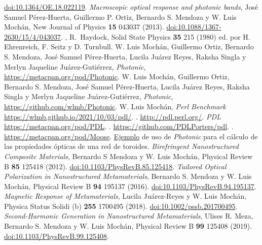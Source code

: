 \documentclass[12pt]{article}
\begin{document}
\begin{thebibliography}{0000}
 \href{https://www.osapublishing.org/oe/fulltext.cfm?uri=oe-18-21-22119&id=206120}
 {doi:10.1364/OE.18.022119}.
   {\em Macroscopic optical response and photonic
    bands}, José Samuel Pérez-Huerta, Guillermo P. Ortiz, Bernardo
  S. Mendoza y W. Luis Mochán, New Journal of Physics {\bf 15}
  043037 (2013).
  \href{https://iopscience.iop.org/article/10.1088/1367-2630/15/4/043037}
  {doi:10.1088/1367-2630/15/4/043037}.
,
R.~Haydock, Solid State Physics  {\bf 35} 215 (1980) ed. por
H. Ehrenreich, F. Seitz y D. Turnbull.
  W. Luis Mochán, Guillermo Ortiz, Bernardo S. Mendoza, José Samuel
  Pérez-Huerta, Lucila Juárez Reyes, Raksha Singla y Merlyn Jaqueline
  Juárez-Gutiérrez, {\em Photonic}, \url{https://metacpan.org/pod/Photonic}.
  W. Luis Mochán, Guillermo Ortiz, Bernardo S. Mendoza, José Samuel
  Pérez-Huerta, Lucila Juárez Reyes, Raksha Singla y Merlyn Jaqueline
  Juárez-Gutiérrez, {\em Photonic}, \url{https://github.com/wlmb/Photonic}.
W. Luis Mochán, {\em Perl Benchmark}
  \url{https://wlmb.github.io/2021/10/03/pdl/}.
.
  \url{http://pdl.perl.org/}.
 {\em PDL} \url{https://metacpan.org/pod/PDL}.
.  \url{https://github.com/PDLPorters/pdl}.
.
  \url{https://metacpan.org/pod/Moose}.
  \href{https://github.com/wlmb/Photonic/blob/master/examples/LE/NR2/toroid.pl}{Ejemplo}
    de uso de {\em Photonic} para el cálculo de las propiedades
    ópticas de una red de toroides.
  {\em Birefringent Nanostructured Composite
      Materials}, Bernardo S Mendoza y W. Luis Mochán, Physical Review
    B {\bf 85} 125418 (2012).
    \href{https://doi.org/10.1103/PhysRevB.85.125418}{doi:10.1103/PhysRevB.85.125418}.
 {\em Tailored Optical Polarization in Nanostructured
    Metamaterials},    Bernardo S. Mendoza y W. Luis Mochán,
  Physical Review B {\bf 94} 195137 (2016).
  \href{https://doi.org/10.1103/PhysRevB.94.195137}{doi:10.1103/PhysRevB.94.195137}.
 {\em Magnetic Response of Metamaterials}, Lucila
  Juárez-Reyes y W. Luis Mochán, Physica Status Solidi (b) {\bf 255}
  1700495 (2018).
  \href{https://doi.org/10.1002/pssb.201700495}{doi:10.1002/pssb.201700495}.
 {\em Second-Harmonic Generation in Nanostructured
    Metamaterials},  Ulises R. Meza, Bernardo S. Mendoza y W. Luis
  Mochán, Physical Review B {\bf 99} 125408
  (2019). \href{https://doi.org/10.1103/PhysRevB.99.125408}
  {doi:10.1103/PhysRevB.99.125408}.


\end{thebibliography}
\end{document}
